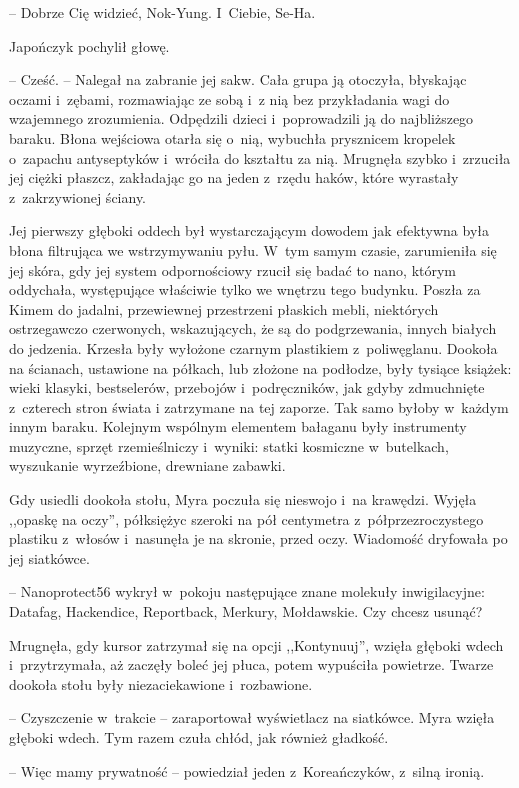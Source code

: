 \documentclass[oneside,polish,11pt,sfheadings]{mwbk}
\begin{document}
-- Dobrze Cię widzieć, Nok-Yung. I~Ciebie, Se-Ha.

Japończyk pochylił głowę. 

-- Cześć. -- Nalegał na zabranie jej sakw. Cała
grupa ją otoczyła, błyskając oczami i~zębami, rozmawiając ze sobą i~z nią bez przykładania wagi do wzajemnego zrozumienia. Odpędzili dzieci i~poprowadzili ją do najbliższego baraku. Błona wejściowa otarła się o~nią, wybuchła prysznicem kropelek o~zapachu antyseptyków i~wróciła do
kształtu za nią. Mrugnęła szybko i~zrzuciła jej ciężki płaszcz,
zakładając go na jeden z~rzędu haków, które wyrastały z~zakrzywionej
ściany.

Jej pierwszy głęboki oddech był wystarczającym dowodem jak efektywna
była błona filtrująca we wstrzymywaniu pyłu. W~tym samym czasie,
zarumieniła się jej skóra, gdy jej system odpornościowy rzucił się badać
to nano, którym oddychała, występujące właściwie tylko we wnętrzu tego
budynku. Poszła za Kimem do jadalni, przewiewnej przestrzeni płaskich
mebli, niektórych ostrzegawczo czerwonych, wskazujących, że są do
podgrzewania, innych białych do jedzenia. Krzesła były wyłożone czarnym
plastikiem z~poliwęglanu. Dookoła na ścianach, ustawione na półkach, lub
złożone na podłodze, były tysiące książek: wieki klasyki, bestselerów,
przebojów i~podręczników, jak gdyby zdmuchnięte z~czterech stron świata
i zatrzymane na tej zaporze. Tak samo byłoby w~każdym innym baraku.
Kolejnym wspólnym elementem bałaganu były instrumenty muzyczne, sprzęt
rzemieślniczy i~wyniki: statki kosmiczne w~butelkach, wyszukanie
wyrzeźbione, drewniane zabawki.

Gdy usiedli dookoła stołu, Myra poczuła się nieswojo i~na krawędzi. Wyjęła
,,opaskę na oczy'', półksiężyc szeroki na pół centymetra z~półprzezroczystego plastiku z~włosów i~nasunęła je na skronie, przed
oczy. Wiadomość dryfowała po jej siatkówce. 

-- Nanoprotect56 wykrył w~pokoju następujące znane molekuły inwigilacyjne: Datafag, Hackendice,
Reportback, Merkury, Mołdawskie. Czy chcesz usunąć?

Mrugnęła, gdy kursor zatrzymał się na opcji ,,Kontynuuj'', wzięła
głęboki wdech i~przytrzymała, aż zaczęły boleć jej płuca, potem
wypuściła powietrze. Twarze dookoła stołu były niezaciekawione i~rozbawione.

-- Czyszczenie w~trakcie -- zaraportował wyświetlacz na siatkówce. Myra
wzięła głęboki wdech. Tym razem czuła chłód, jak również gładkość.

-- Więc mamy prywatność -- powiedział jeden z~Koreańczyków, z~silną
ironią.
\end{document}
